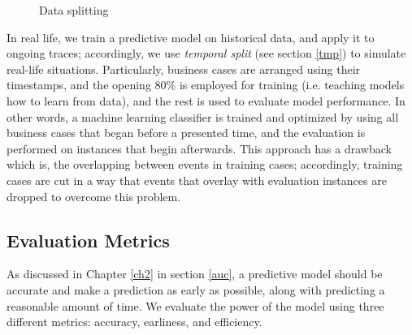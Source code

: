 \begin{figure}[htb]
	\begin{center}
		\caption{Data splitting}
		\label{fig:all3}
	\end{center}
\end{figure}

In real life, we train a predictive model on historical data, and apply it to ongoing traces; accordingly, we use \textit{temporal split} (see section \ref{tmp}) to simulate real-life situations. Particularly, business cases are arranged using their timestamps, and the opening $80\%$ is employed for training (i.e. teaching models how to learn from data), and the rest is used to evaluate model performance. In other words, a machine learning classifier is trained and optimized by using all business cases that began before a presented time, and the evaluation  is performed on instances  that begin afterwards. This approach has a drawback which is, the overlapping between events in training cases; accordingly, training cases are cut in a way that events that overlay with evaluation instances are dropped to overcome this problem. 





\subsection{Evaluation Metrics} \label{evm}
As discussed in Chapter \ref{ch2} in section \ref{auc}, a predictive model should be accurate and make a prediction as early as possible, along with predicting a reasonable amount of time. We evaluate the power of the model using three different metrics: accuracy, earliness, and efficiency.

